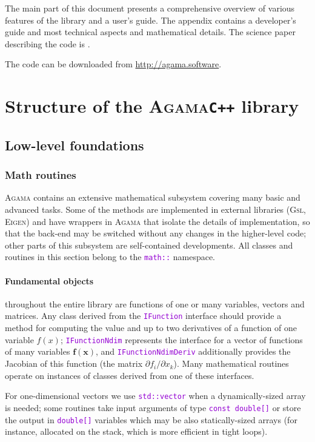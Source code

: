 \documentclass[12pt]{article}
\newcommand{\Agama}{\textsc{Agama}\xspace}
\newcommand{\Gsl}  {\textsc{Gsl}\xspace}
\newcommand{\Eigen}{\textsc{Eigen}\xspace}
\newcommand{\Cpp}  {\texttt{C++}\xspace}
\newcommand{\ttt}[1]{\textcolor{darkviolet}{\texttt{#1}}}
\newcommand{\D}{\partial}
\newcommand{\bx}{\boldsymbol{x}}
\begin{document}
The main part of this document presents a comprehensive overview of various features of the library and a user's guide. The appendix contains a developer's guide and most technical aspects and mathematical details. The science paper describing the code is \cite{Vasiliev2019}.

The code can be downloaded from \url{http://agama.software}.


\section{Structure of the \Agama \Cpp library}  \label{sec:Structure}

\subsection{Low-level foundations}

\subsubsection{Math routines}  \label{sec:Math}
\Agama contains an extensive mathematical subsystem covering many basic and advanced tasks. Some of the methods are implemented in external libraries (\Gsl, \Eigen) and have wrappers in \Agama that isolate the details of implementation, so that the back-end may be switched without any changes in the higher-level code; other parts of this subsystem are self-contained developments.
All classes and routines in this section belong to the \ttt{math::} namespace.

\paragraph{Fundamental objects}
throughout the entire library are functions of one or many variables, vectors and matrices.
Any class derived from the \ttt{IFunction} interface should provide a method for computing the value and up to two derivatives of a function of one variable $f(x)$; \ttt{IFunctionNdim} represents the interface for a vector of functions of many variables $\boldsymbol{f}(\bx)$, and \ttt{IFunctionNdimDeriv} additionally provides the Jacobian of this function (the matrix $\D f_i /\D x_k$). Many mathematical routines operate on instances of classes derived from one of these interfaces.

For one-dimensional vectors we use \ttt{std::vector} when a dynamically-sized array is needed; some routines take input arguments of type \ttt{const double[]} or store the output in \ttt{double[]} variables which may be also statically-sized arrays (for instance, allocated on the stack, which is more efficient in tight loops).
\end{document}
